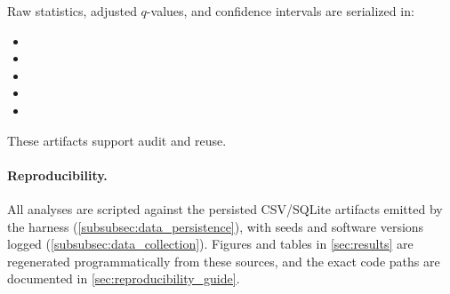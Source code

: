 Raw statistics, adjusted $q$-values, and confidence intervals are serialized in:
\begin{itemize}
	\item {}
	\item {}
	\item {}
	\item {}
	\item {}
\end{itemize}
These artifacts support audit and reuse.

\paragraph{Reproducibility.} All analyses are scripted against the persisted CSV/SQLite artifacts emitted by the harness (\cref{subsubsec:data_persistence}), with seeds and software versions logged (\cref{subsubsec:data_collection}). Figures and tables in \cref{sec:results} are regenerated programmatically from these sources, and the exact code paths are documented in \cref{sec:reproducibility_guide}.
